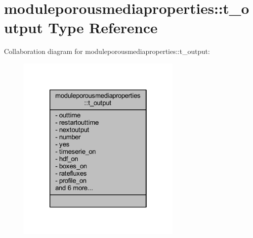\hypertarget{structmoduleporousmediaproperties_1_1t__output}{}\section{moduleporousmediaproperties\+:\+:t\+\_\+output Type Reference}
\label{structmoduleporousmediaproperties_1_1t__output}


Collaboration diagram for moduleporousmediaproperties\+:\+:t\+\_\+output\+:\nopagebreak
\begin{figure}[H]
\begin{center}
\leavevmode
\includegraphics[width=226pt]{structmoduleporousmediaproperties_1_1t__output__coll__graph}
\end{center}
\end{figure}
